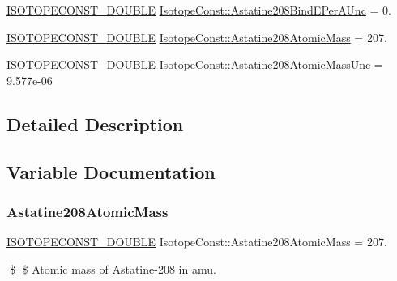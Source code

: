 \begin{DoxyCompactItemize}
\mbox{\hyperlink{group___isotope_const-_macros_ga8f45a7272ce02c0b4c65c44636ed719a}{I\+S\+O\+T\+O\+P\+E\+C\+O\+N\+S\+T\+\_\+\+D\+O\+U\+B\+LE}} \mbox{\hyperlink{group___isotope_const-_astatine-_at208_ga8a4931aebdde25691960a9b6dacb9061}{Isotope\+Const\+::\+Astatine208\+Bind\+E\+Per\+A\+Unc}} = 0.
\item 
\mbox{\hyperlink{group___isotope_const-_macros_ga8f45a7272ce02c0b4c65c44636ed719a}{I\+S\+O\+T\+O\+P\+E\+C\+O\+N\+S\+T\+\_\+\+D\+O\+U\+B\+LE}} \mbox{\hyperlink{group___isotope_const-_astatine-_at208_gab357b065d2966ce22a36ac169a258db1}{Isotope\+Const\+::\+Astatine208\+Atomic\+Mass}} = 207.
\item 
\mbox{\hyperlink{group___isotope_const-_macros_ga8f45a7272ce02c0b4c65c44636ed719a}{I\+S\+O\+T\+O\+P\+E\+C\+O\+N\+S\+T\+\_\+\+D\+O\+U\+B\+LE}} \mbox{\hyperlink{group___isotope_const-_astatine-_at208_ga7057b2ce313094c97ba8c98230e81dab}{Isotope\+Const\+::\+Astatine208\+Atomic\+Mass\+Unc}} = 9.\+577e-\/06
\end{DoxyCompactItemize}


\subsection{Detailed Description}


\subsection{Variable Documentation}
\mbox{\label{group___isotope_const-_astatine-_at208_gab357b065d2966ce22a36ac169a258db1}} 
\subsubsection{\texorpdfstring{Astatine208\+Atomic\+Mass}{Astatine208AtomicMass}}
{\footnotesize\ttfamily \mbox{\hyperlink{group___isotope_const-_macros_ga8f45a7272ce02c0b4c65c44636ed719a}{I\+S\+O\+T\+O\+P\+E\+C\+O\+N\+S\+T\+\_\+\+D\+O\+U\+B\+LE}} Isotope\+Const\+::\+Astatine208\+Atomic\+Mass = 207.}

\$ \$ Atomic mass of Astatine-\/208 in amu. \mbox{\label{group___isotope_const-_astatine-_at208_ga7057b2ce313094c97ba8c98230e81dab}} 
